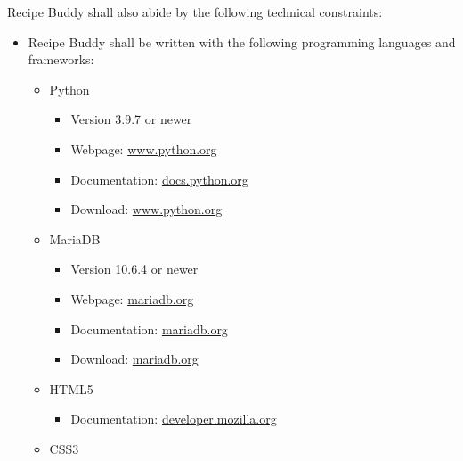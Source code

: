 \documentclass{scrreprt}
\begin{document}
Recipe Buddy shall also abide by the following technical constraints:
\begin{itemize}
    \item Recipe Buddy shall be written with the following programming languages and frameworks:
    \begin{itemize}

        \item \gls{Python}
        \begin{itemize}

            \item Version 3.9.7 or newer
            \item Webpage: \href{https://www.python.org/}{www.python.org}
            \item Documentation: \href{https://docs.python.org/3.9/}{docs.python.org}
            \item Download: \href{https://www.python.org/downloads/release/python-397/}{www.python.org}

        \end{itemize}

        \item MariaDB
        \begin{itemize}

            \item Version 10.6.4 or newer
            \item Webpage: \href{https://mariadb.org/}{mariadb.org}
            \item Documentation: \href{https://mariadb.com/kb/en/}{mariadb.org}
            \item Download: \href{https://mariadb.org/download/?tab=mariadb&release=10.6.4&product=mariadb}{mariadb.org}
        
        \end{itemize}
        
        \item HTML5
        \begin{itemize}
        
            \item Documentation: \href{https://developer.mozilla.org/en-US/docs/Web/HTML}{developer.mozilla.org}
        
        \end{itemize}
        
        \item CSS3
        \begin{itemize}
        

\end{itemize}
\end{itemize}
\end{itemize}
\end{document}
